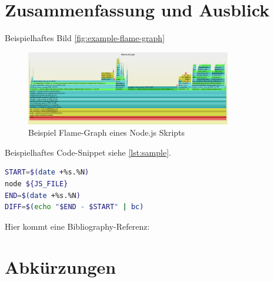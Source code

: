 \documentclass[
12pt,
english,
ngerman,
headsepline,
twoside,
openright,
numbers=noenddot,version=first
]{scrreprt}
\begin{document}
\chapter{Zusammenfassung und Ausblick}


Beispielhaftes Bild \autoref{fig:example-flame-graph}

\begin{figure}[h]
	\centering
	\includegraphics[width=0.8\textwidth]{pics/example-flame-graph.eps}
	\caption{Beispiel Flame-Graph eines Node.js Skripts}
	\label{fig:example-flame-graph}
\end{figure}

Beispielhaftes Code-Snippet siehe \autoref{lst:sample}.

\begin{lstlisting}[language=bash,caption={Aufnahme der \glqq real\grqq-Zeit},label={lst:sample}]
START=$(date +%s.%N)
node ${JS_FILE}
END=$(date +%s.%N)
DIFF=$(echo "$END - $START" | bc)
\end{lstlisting}

Hier kommt eine Bibliography-Referenz: \cite{booch2007object}

\lstlistoflistings

\listoffigures

\listoftables

\chapter*{Abkürzungen}


\end{document}
